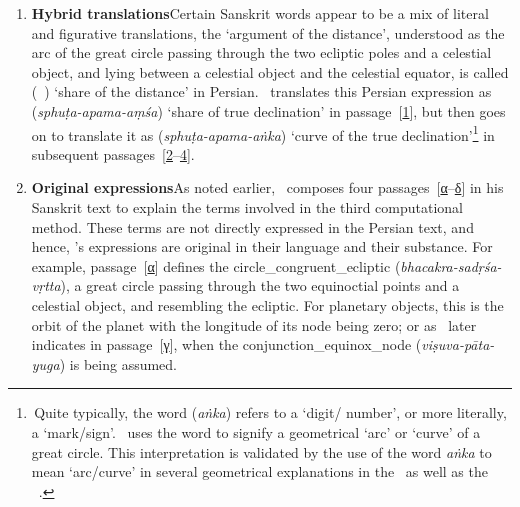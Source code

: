 \begin{enumerate}[topsep=0pt]
    \item \textbf{Hybrid translations}\quad Certain Sanskrit words appear to be a mix of literal and figurative translations, \eg 
    the `argument of the distance', understood as the arc of the great circle passing through the two ecliptic poles and a celestial object, and lying between a celestial object and the celestial equator, is called  (\hissi\idafavowel\ \bud) `share of the distance' in Persian. \Nityananda\ translates this Persian expression as  (\textit{sphuṭa-apama-aṃśa}) `share of true declination' in passage~[\hyperlink{SEpass1}{1}], but then goes on to translate it as  (\textit{sphuṭa-apama-aṅka}) `curve of the true declination'\footnote{\,Quite typically, the word  (\textit{aṅka}) refers to a `digit/ number', or more literally, a `mark/sign'. \Nityananda\ uses the word to signify a geometrical `arc' or `curve' of a great circle. This interpretation is validated by the use of the word \textit{aṅka} to mean `arc/curve' in several geometrical explanations in the \Siddhantasindhu\ as well as the \Sarvasiddhantaraja\ \parencite[\eg \vid][279]{Misrathesis}.} in subsequent passages~[\hyperlink{SEpass2}{2}--\hyperlink{SEpass4}{4}].

    \item \textbf{Original expressions}\quad  As noted earlier, \Nityananda\ composes four passages~[\hyperlink{SpassA}{α}--\hyperlink{SpassD}{δ}] in his Sanskrit text to explain the
    terms involved in the third computational method. These terms are not directly expressed in the Persian text, and hence, \Nityananda's expressions are original in their language and their substance. For example, passage~[\hyperlink{SEpassA}{α}] defines the \gls{circle_congruent_ecliptic}  (\textit{bhacakra-sadṛśa-vṛtta}), a great circle passing through the two equinoctial points and a celestial object, and resembling the ecliptic. For planetary objects, this is the orbit of the planet with the longitude of its node being zero; or as \Nityananda\ later indicates in passage~[\hyperlink{SEpassC}{γ}], when the \gls{conjunction_equinox_node}  (\textit{viṣuva-pāta-yuga}) is being assumed.
    

\end{enumerate}
